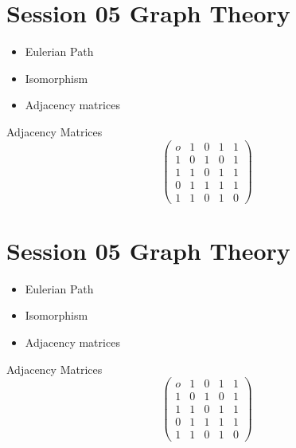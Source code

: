 \documentclass[]{report}
\begin{document}







\section*{Session 05 Graph Theory}
\begin{itemize}
\item Eulerian Path
\item Isomorphism
\item Adjacency matrices
\end{itemize}
Adjacency Matrices
\[ \left( \begin{matrix}
o & 1 & 0 & 1 & 1 \\ 
1 & 0 & 1 & 0 & 1 \\ 
1 & 1 & 0 & 1 & 1 \\ 
0 & 1 & 1 & 1 & 1 \\ 
1 & 1 & 0 & 1 & 0
\end{matrix} \right) \]


\section*{Session 05 Graph Theory}
\begin{itemize}
\item Eulerian Path
\item Isomorphism
\item Adjacency matrices
\end{itemize}
Adjacency Matrices
\[ \left( \begin{matrix}
o & 1 & 0 & 1 & 1 \\ 
1 & 0 & 1 & 0 & 1 \\ 
1 & 1 & 0 & 1 & 1 \\ 
0 & 1 & 1 & 1 & 1 \\ 
1 & 1 & 0 & 1 & 0
\end{matrix} \right) \]
\end{document}
